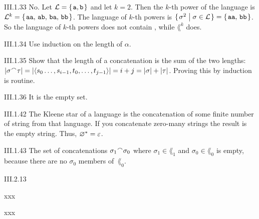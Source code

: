 %
\begin{ans}{III.1.33}
No.
Let $\lang=\set{\str{a}, \str{b}}$ and let $k=2$.
Then the $k$-th power of the language is
$\lang^k=\set{\str{aa},\,\str{ab},\,\str{ba},\,\str{bb}}$.
The language of $k$-th powers is
$\set{\sigma^2\suchthat \sigma\in\lang}=\set{\str{aa},\,\str{bb}}$.
So the language of $k$-th powers does not contain , while
$\lang^k$ does.
\end{ans}
%
\begin{ans}{III.1.34}
Use induction on the length of $\alpha$.
\end{ans}
%
\begin{ans}{III.1.35}
Show that the length of a concatenation is the sum of the two lengths:
$\lh{\sigma\concat\tau}=
\lh{\sequence{s_0\ldots,s_{i-1},t_0,\ldots,t_{j-1}}}=i+j=\lh{\sigma}+\lh{\tau}$.
Proving this by induction is routine.
\end{ans}
%
\begin{ans}{III.1.36}
It is the empty set.
\end{ans}
%
%
%
%
%
%
\begin{ans}{III.1.42}
The Kleene star of a language is the concatenation of some finite number of
string from that language.
If you concatenate zero-many strings the result is the empty string.
Thus, ${{\varnothing}^{*}}=\varepsilon$.
\end{ans}
%
\begin{ans}{III.1.43}
The set of concatenations $\sigma_1\concat\sigma_0$ where
$\sigma_1\in\lang_1$ and $\sigma_0\in\lang_0$ is empty,
because there are no $\sigma_0$ members of~$\lang_0$.
\end{ans}
%
%
%
%
%
%
%
%
%
%
%
%
\begin{ans}{III.2.13}
\begin{exparts}
\item xxx
\item xxx
\end{exparts}
\end{ans}
